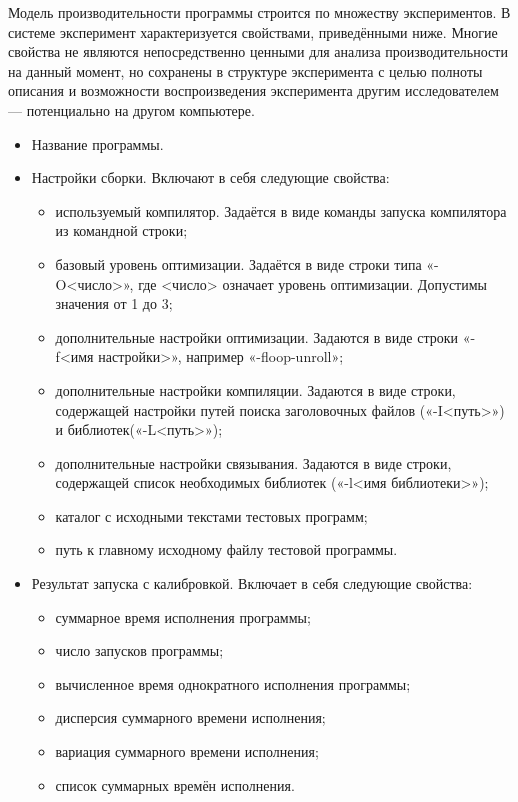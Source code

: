 Модель производительности программы строится по множеству экспериментов. В системе эксперимент характеризуется свойствами, приведёнными ниже. Многие свойства не являются непосредственно ценными для анализа производительности на данный момент, но сохранены в структуре эксперимента с целью полноты описания и возможности воспроизведения эксперимента другим исследователем --- потенциально на другом компьютере.

\begin{itemize}
	\item Название программы.
	\item Настройки сборки. Включают в себя следующие свойства:
	\begin{itemize}
	    \item используемый компилятор. Задаётся в виде команды запуска компилятора из командной строки;
	    \item базовый уровень оптимизации. Задаётся в виде строки типа «-O<число>», где <число> означает уровень оптимизации. Допустимы значения от 1 до 3;
	    \item дополнительные настройки оптимизации. Задаются в виде строки «-f<имя настройки>», например «-floop-unroll»;
	    \item дополнительные настройки компиляции. Задаются в виде строки, содержащей настройки путей поиска заголовочных файлов («-I<путь>») и библиотек(«-L<путь>»);
	    \item дополнительные настройки связывания. Задаются в виде строки, содержащей список необходимых библиотек («-l<имя библиотеки>»);
	    \item каталог с исходными текстами тестовых программ;
	    \item путь к главному исходному файлу тестовой программы.
	\end{itemize}

	\item Результат запуска с калибровкой. Включает в себя следующие свойства:
	\begin{itemize}
		\item суммарное время исполнения программы;
		\item число запусков программы;
		\item вычисленное время однократного исполнения программы;
		\item дисперсия суммарного времени исполнения;
		\item вариация суммарного времени исполнения;
		\item список суммарных времён исполнения.
	\end{itemize}


\end{itemize}
